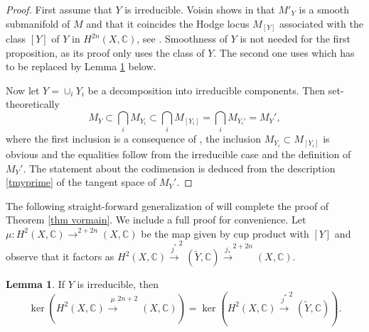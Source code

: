 \documentclass[a4paper,11pt,final]{amsart}
\theoremstyle{plain}
\theoremstyle{definition}
\newtheorem{lemma}[subsection]{Lemma}
\numberwithin{equation}{section}
\theoremstyle{remark}
\begin{document}
\begin{proof}
First assume that $Y$ is irreducible. 
Voisin shows in \cite[Propositions 1.2 and 1.7]{Vo92} that $M'_{Y}$ is a smooth submanifold of $M$ and that it coincides the Hodge locus $M_{[Y]}$ associated with the class $[Y]$ of $Y$ in $H^{2n}(X,{{\mathbb C}})$, see \cite[Ch 5.3]{Vo2}. Smoothness of $Y$ is not needed for the first proposition, as its proof only uses the class of $Y$. The second one uses \cite[Lemme 1.5]{Vo92} which has to be replaced by Lemma \ref{lem rang} below.

Now let $Y=\cup_iY_i$ be a decomposition into irreducible components. Then set-theoretically
\begin{equation}\label{eq inclusions}
 M_Y \subset \bigcap_i M_{Y_i} \subset \bigcap_i M_{[Y_i]} = \bigcap_i M_{Y_i'} = M_Y',
\end{equation}
where the first inclusion is a consequence of \cite[Lemma 1.4]{CL12}, the inclusion $M_{Y_i}\subset M_{[Y_i]}$ is obvious and the equalities follow from 
the irreducible case and the definition of $M_Y'$. 
The statement about the codimension is deduced from the description \eqref{tmyprime} of the tangent space of $M_Y'$. 
\end{proof}
The following straight-forward generalization of \cite[Lemme 1.5]{Vo92} will complete the proof of Theorem \ref{thm vormain}. We include a full proof for convenience. Let $\mu:H^2(X,{{\mathbb C}}){\xrightarrow{\ \ }}^{2+2n}(X,{{\mathbb C}})$ be the map given by cup product with $[Y]$ and observe that it factors as
$H^2(X,{{\mathbb C}}){\xrightarrow{\ j^*\ }}^2({{\widetilde{Y}}},{{\mathbb C}}) {\xrightarrow{\ j_*\ }}^{2+2n}(X,{{\mathbb C}})$.
\begin{lemma}\label{lem rang}
If $Y$ is irreducible, then
\[
\ker \left(H^2(X,{{\mathbb C}}) {\xrightarrow{\ \mu\ }}^{2n+2}(X,{{\mathbb C}})\right) = \ker \left(H^2(X,{{\mathbb C}}){\xrightarrow{\ j^*\ }}^2({{\widetilde{Y}}},{{\mathbb C}})\right).
\]
\end{lemma}
\end{document}
